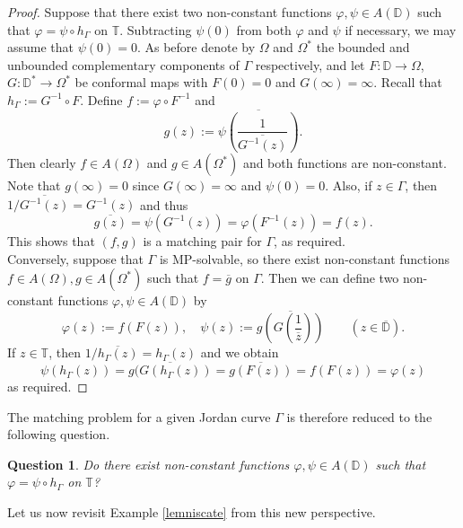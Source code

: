 \documentclass{amsart}
\theoremstyle{plain}
\newtheorem{question}[theorem]{Question}
\theoremstyle{definition}
\theoremstyle{remark}
\newcommand{\mD}{\mathbb{D}}
\newcommand{\mT}{\mathbb{T}}
\begin{document}
\begin{proof}
Suppose that there exist two non-constant functions $\varphi, \psi \in A(\mD)$ such that $\varphi = \psi \circ h_\Gamma$ on $\mT$. Subtracting $\psi(0)$ from both $\varphi$ and $\psi$ if necessary, we may assume that $\psi(0)=0$. As before denote by $\Omega$ and $\Omega^*$ the bounded and unbounded complementary components of $\Gamma$ respectively, and let $F:\mD \to \Omega$, $G:\mD^* \to \Omega^*$ be conformal maps with $F(0)=0$ and $G(\infty)=\infty$. Recall that $h_\Gamma:=G^{-1} \circ F$. Define $f:= \varphi \circ F^{-1}$ and
$$g(z):= \overline{\psi \left( \frac{1}{\overline{G^{-1}(z)}}\right)}.$$
Then clearly $f \in A(\Omega)$ and $g \in A(\Omega^*)$ and both functions are non-constant. Note that $g(\infty)=0$ since $G(\infty)=\infty$ and $\psi(0)=0$. Also, if $z \in \Gamma$, then $1/\overline{G^{-1}(z)}=G^{-1}(z)$ and thus
$$\overline{g(z)} = \psi(G^{-1}(z)) = \varphi(F^{-1}(z))=f(z).$$
This shows that $(f,g)$ is a matching pair for $\Gamma$, as required.
\\

Conversely, suppose that $\Gamma$ is MP-solvable, so there exist non-constant functions $f \in A(\Omega), g \in A(\Omega^*)$ such that $f=\overline{g}$ on $\Gamma$. Then we can define two non-constant functions $\varphi, \psi \in A(\mD)$ by
$$
\varphi(z):=f(F(z)), \quad \psi(z):=\overline{g\left(G\left(\frac{1}{\overline{z}}\right)\right)} \qquad (z \in \overline{\mD}).
$$
If $z \in \mT$, then $1/\overline{h_\Gamma(z)}=h_\Gamma(z)$ and we obtain
$$\psi(h_\Gamma(z)) = \overline{g(G(h_\Gamma(z))} = \overline{g(F(z))} = f(F(z))=\varphi(z)$$
as required.
\end{proof}


The matching problem for a given Jordan curve $\Gamma$ is therefore reduced to the following question.

\begin{question}
\label{question:diskalgebra}
Do there exist non-constant functions $\varphi, \psi \in A(\mD)$ such that $\varphi=\psi \circ h_\Gamma$ on $\mT$?
\end{question}

Let us now revisit Example \ref{lemniscate} from this new perspective.
\end{document}
